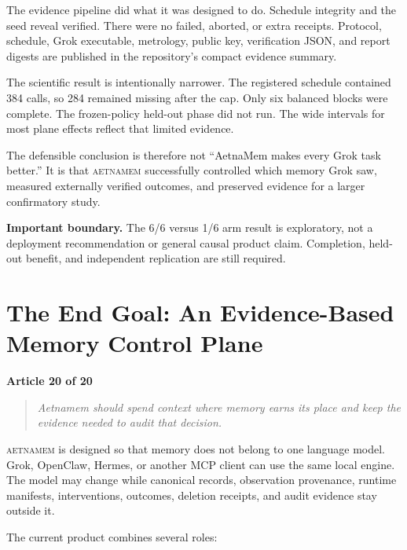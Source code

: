 \documentclass[11pt]{article}
\newcommand{\system}{\textsc{aetnamem}}
\newcommand{\articlelabel}[1]{%
  \noindent\colorbox{aetnaTeal!10}{%
    \parbox{0.96\textwidth}{\color{aetnaInk}\small\textbf{Article #1 of 20}}}%
  \par\medskip}
\newcommand{\coreidea}[1]{%
  \begin{quote}\color{aetnaTeal}\large\itshape #1\end{quote}}
\newcommand{\boundary}[1]{%
  \par\smallskip\noindent\textbf{Important boundary.} #1}
\begin{document}
The evidence pipeline did what it was designed to do. Schedule integrity and
the seed reveal verified. There were no failed, aborted, or extra receipts.
Protocol, schedule, Grok executable, metrology, public key, verification JSON,
and report digests are published in the repository's compact evidence summary.

The scientific result is intentionally narrower. The registered schedule
contained 384 calls, so 284 remained missing after the cap. Only six balanced
blocks were complete. The frozen-policy held-out phase did not run. The wide
intervals for most plane effects reflect that limited evidence.

The defensible conclusion is therefore not ``AetnaMem makes every Grok task
better.'' It is that \system{} successfully controlled which memory Grok saw,
measured externally verified outcomes, and preserved evidence for a larger
confirmatory study.

\boundary{The 6/6 versus 1/6 arm result is exploratory, not a deployment
recommendation or general causal product claim. Completion, held-out benefit,
and independent replication are still required.}

\clearpage
\section{The End Goal: An Evidence-Based Memory Control Plane}
\articlelabel{20}
\coreidea{Aetnamem should spend context where memory earns its place and keep
the evidence needed to audit that decision.}

\system{} is designed so that memory does not belong to one language model.
Grok, OpenClaw, Hermes, or another MCP client can use the same local engine.
The model may change while canonical records, observation provenance, runtime
manifests, interventions, outcomes, deletion receipts, and audit evidence stay
outside it.

The current product combines several roles:
\end{document}
